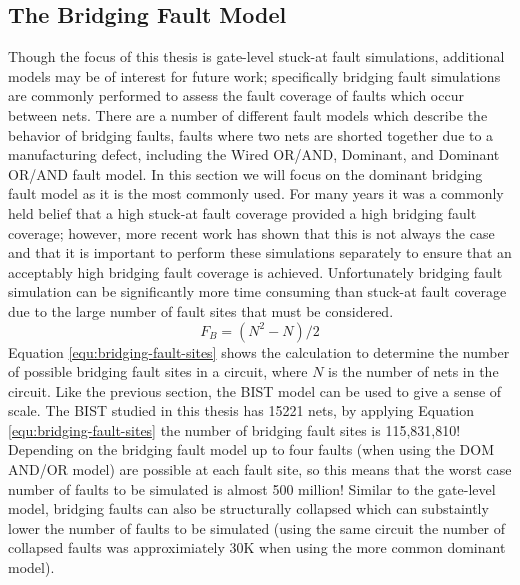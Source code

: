 \documentclass[12pt]{report}
\begin{document}
\subsection{The Bridging Fault Model}
\label{sct:bridgingfaults}
Though the focus of this thesis is gate-level stuck-at fault simulations, additional models may be of interest for future work; specifically bridging fault simulations are commonly performed to assess the fault coverage of faults which occur between nets.  There are a number of different fault models which describe the behavior of bridging faults, faults where two nets are shorted together due to a manufacturing defect, including the Wired OR/AND, Dominant, and Dominant OR/AND fault model\cite{stroud-bridging}.  In this section we will focus on the dominant bridging fault model as it is the most commonly used\cite{stroud}.  For many years it was a commonly held belief that a high stuck-at fault coverage provided a high bridging fault coverage; however, more recent work has shown that this is not always the case and that it is important to perform these simulations separately to ensure that an acceptably high bridging fault coverage is achieved\cite{stroud-bridging-physical}.  Unfortunately bridging fault simulation can be significantly more time consuming than stuck-at fault coverage due to the large number of fault sites that must be considered.
\begin{equation}
F_B = (N^2-N)/2
\label{equ:bridging-fault-sites}
\end{equation}
Equation \ref{equ:bridging-fault-sites} shows the calculation to determine the number of possible bridging fault sites in a circuit, where $N$ is the number of nets in the circuit\cite{stroud}.  Like the previous section, the BIST model can be used to give a sense of scale.  The BIST studied in this thesis has 15221 nets, by applying Equation \ref{equ:bridging-fault-sites} the number of bridging fault sites is 115,831,810!  Depending on the bridging fault model up to four faults (when using the DOM AND/OR model\cite{stroud-bridging}) are possible at each fault site, so this means that the worst case number of faults to be simulated is almost 500 million!  Similar to the gate-level model, bridging faults can also be structurally collapsed which can substaintly lower the number of faults to be simulated (using the same circuit the number of collapsed faults was approximiately 30K when using the more common dominant model).
\end{document}
